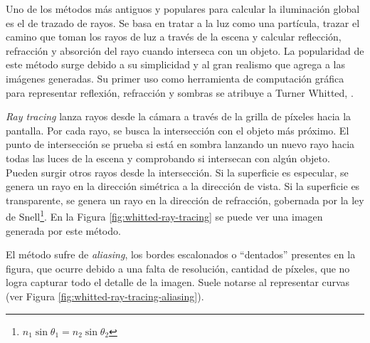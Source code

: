 Uno de los métodos más antiguos y populares para calcular la iluminación global es el de trazado de rayos.
Se basa en tratar a la luz como una partícula, trazar el camino que toman los rayos de luz a través de la escena y calcular reflección, refracción y absorción del rayo cuando interseca con un objeto.
La popularidad de este método surge debido a su simplicidad y al gran realismo que agrega a las imágenes generadas.
Su primer uso como herramienta de computación gráfica para representar reflexión, refracción y sombras se atribuye a Turner Whitted, \cite{whitted-1980}.

\textit{Ray tracing} lanza rayos desde la cámara a través de la grilla de píxeles hacia la pantalla.
Por cada rayo, se busca la intersección con el objeto más próximo.
El punto de intersección se prueba si está en sombra lanzando un nuevo rayo hacia todas las luces de la escena y comprobando si intersecan con algún objeto.
Pueden surgir otros rayos desde la intersección.
Si la superficie es especular, se genera un rayo en la dirección simétrica a la dirección de vista.
Si la superficie es transparente, se genera un rayo en la dirección de refracción, gobernada por la ley de Snell\footnote{$n_1 \sin{\theta_1} = n_2 \sin{\theta_2}$}.
En la Figura \ref{fig:whitted-ray-tracing} se puede ver una imagen generada por este método.

El método sufre de \textit{aliasing}, los bordes escalonados o ``dentados'' presentes en la figura, que ocurre debido a una falta de resolución, cantidad de píxeles, que no logra capturar todo el detalle de la imagen.
Suele notarse al representar curvas (ver Figura \ref{fig:whitted-ray-tracing-aliasing}).


